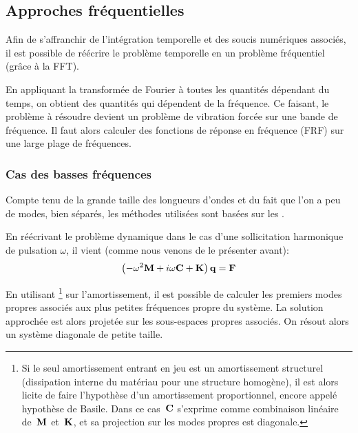 \medskip
\subsection{Approches fréquentielles}

Afin de s'affranchir de l'intégration temporelle et des soucis numériques associés, il est
possible de réécrire le problème temporelle en un problème fréquentiel (grâce à
la FFT).


\medskip
En appliquant la transformée de Fourier
à toutes les quantités dépendant du temps,
on obtient des quantités qui dépendent de la fréquence.
Ce faisant, le problème à résoudre devient un problème de vibration
forcée sur une bande de fréquence.
Il faut alors calculer des fonctions de réponse en fréquence (FRF) sur une large plage
de fréquences.

\medskip
\subsubsection{Cas des basses fréquences}

Compte tenu de la grande taille des longueurs d'ondes et du fait que l'on a peu de modes, bien séparés,
les méthodes utilisées sont basées sur les .

En réécrivant le problème dynamique dans le cas d'une sollicitation harmonique de pulsation
$\omega$, il vient (comme nous venons de le présenter avant):
\begin{equation}
\left(-\omega^2\MM{M}+i\omega \MM{C}+\MM{K}\right)\VV{q} = \VV{F}
\end{equation}

En utilisant \footnote{%
Si le seul amortissement entrant en jeu est un amortissement structurel (dissipation
interne du matériau pour une structure homogène), il est alors licite de faire
l'hypothèse d'un amortissement proportionnel, encore appelé hypothèse de
Basile. Dans ce cas~$\MM{C}$ s'exprime comme combinaison linéaire de~$\MM{M}$ et~$\MM{K}$,
et sa projection sur les modes propres est diagonale.
} sur l'amortissement, il est possible de calculer les premiers modes propres
associés aux plus petites fréquences propre du système.
La solution approchée est alors projetée sur les sous-espaces propres associés.
On résout alors un système diagonale de petite taille.

